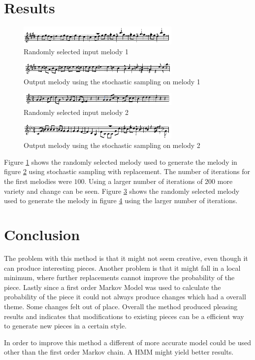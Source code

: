 \section{Results}
\begin{figure}[h!]
\centerline{\includegraphics[width=300px]{../images/swr_in.pdf}}
\caption{Randomly selected input melody 1}
\label{ims:swr_in}
\end{figure}

\begin{figure}[h!]
\centerline{\includegraphics[width=300px]{../images/swr_out.pdf}}
\caption{Output melody using the stochastic sampling on melody 1}
\label{ims:swr_out}
\end{figure}

\begin{figure}[h!]
\centerline{\includegraphics[width=300px]{../images/swr_in2.pdf}}
\caption{Randomly selected input melody 2}
\label{ims:swr_in2}
\end{figure}

\begin{figure}[h!]
\centerline{\includegraphics[width=300px]{../images/swr_out2.pdf}}
\caption{Output melody using the stochastic sampling on melody 2}
\label{ims:swr_out2}
\end{figure}

Figure \ref{ims:swr_in} shows the randomly selected melody used to generate the melody in figure \ref{ims:swr_out} using stochastic sampling with replacement. The number of iterations for the first melodies were $100$.
Using a larger number of iterations of $200$ more variety and change can be seen. Figure \ref{ims:swr_in2} shows the randomly selected melody used to generate the melody in figure \ref{ims:swr_out2} using the larger number of iterations.


\section{Conclusion}
The problem with this method is that it might not seem creative, even though it can produce interesting pieces. Another problem is that it might fall in a local minimum, where further replacements cannot improve the probability of the piece. Lastly since a first order Markov Model was used to calculate the probability of the piece it could not always produce changes which had a overall theme. Some changes felt out of place.
Overall the method produced pleasing results and indicates that modifications to existing pieces can be a efficient way to generate new pieces in a certain style.

In order to improve this method a different of more accurate model could be used other than the first order Markov chain. A \ac{HMM} might yield better results.